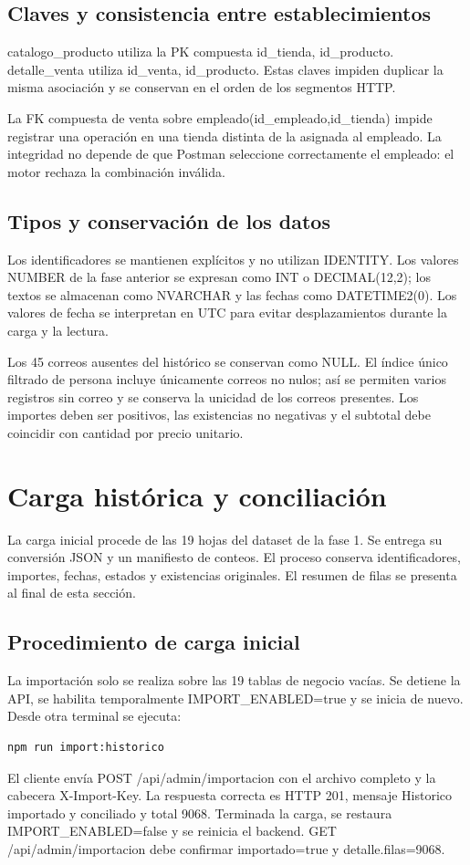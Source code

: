 \subsection{Claves y consistencia entre establecimientos}
catalogo\_producto utiliza la PK compuesta id\_tienda, id\_producto. detalle\_venta utiliza id\_venta, id\_producto. Estas claves impiden duplicar la misma asociación y se conservan en el orden de los segmentos HTTP.

La FK compuesta de venta sobre empleado(id\_empleado,id\_tienda) impide registrar una operación en una tienda distinta de la asignada al empleado. La integridad no depende de que Postman seleccione correctamente el empleado: el motor rechaza la combinación inválida.

\subsection{Tipos y conservación de los datos}
Los identificadores se mantienen explícitos y no utilizan IDENTITY. Los valores NUMBER de la fase anterior se expresan como INT o DECIMAL(12,2); los textos se almacenan como NVARCHAR y las fechas como DATETIME2(0). Los valores de fecha se interpretan en UTC para evitar desplazamientos durante la carga y la lectura.

Los 45 correos ausentes del histórico se conservan como NULL. El índice único filtrado de persona incluye únicamente correos no nulos; así se permiten varios registros sin correo y se conserva la unicidad de los correos presentes. Los importes deben ser positivos, las existencias no negativas y el subtotal debe coincidir con cantidad por precio unitario.

\section{Carga histórica y conciliación}
La carga inicial procede de las 19 hojas del dataset de la fase 1. Se entrega su conversión JSON y un manifiesto de conteos. El proceso conserva identificadores, importes, fechas, estados y existencias originales. El resumen de filas se presenta al final de esta sección.

\subsection{Procedimiento de carga inicial}
La importación solo se realiza sobre las 19 tablas de negocio vacías. Se detiene la API, se habilita temporalmente IMPORT\_ENABLED=true y se inicia de nuevo. Desde otra terminal se ejecuta:
\begin{lstlisting}
npm run import:historico
\end{lstlisting}
El cliente envía POST /api/admin/importacion con el archivo completo y la cabecera X-Import-Key. La respuesta correcta es HTTP 201, mensaje Historico importado y conciliado y total 9068. Terminada la carga, se restaura IMPORT\_ENABLED=false y se reinicia el backend. GET /api/admin/importacion debe confirmar importado=true y detalle.filas=9068.

